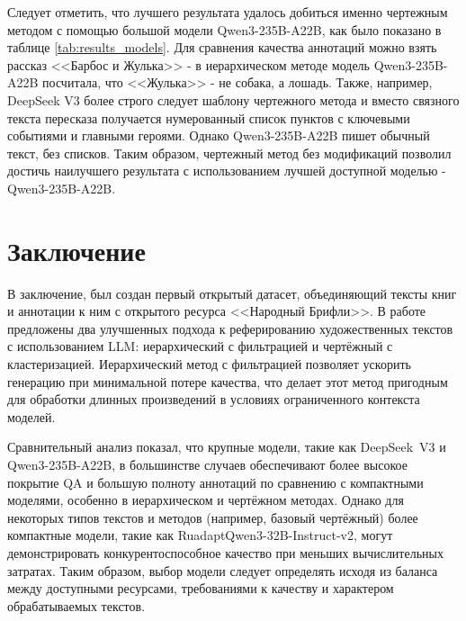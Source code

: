 \documentclass{article}
\begin{document}
Следует отметить, что лучшего результата удалось добиться именно чертежным методом с помощью большой модели Qwen3-\allowbreak 235B-\allowbreak A22B, 
как было показано в таблице \ref{tab:results_models}. Для сравнения качества аннотаций можно взять рассказ <<Барбос и Жулька>> - в иерархическом методе
модель Qwen3-\allowbreak 235B-\allowbreak A22B посчитала, что <<Жулька>> - не собака, а лошадь. Также, например, DeepSeek V3 более строго следует шаблону чертежного метода и вместо связного текста пересказа получается нумерованный список
пунктов с ключевыми событиями и главными героями. Однако Qwen3-\allowbreak 235B-\allowbreak A22B пишет обычный текст, без списков. Таким образом, чертежный метод без модификаций позволил достичь наилучшего результата с использованием лучшей доступной моделью - 
Qwen3-\allowbreak 235B-\allowbreak A22B.


\section*{Заключение}
В заключение, был создан первый открытый датасет, объединяющий тексты книг и аннотации к ним с открытого ресурса <<Народный Брифли>>. 
В работе предложены два улучшенных подхода к реферированию художественных текстов с использованием LLM: иерархический с фильтрацией и чертёжный с кластеризацией. 
Иерархический метод с фильтрацией позволяет ускорить генерацию при минимальной потере качества, 
что делает этот метод пригодным для обработки длинных произведений в условиях ограниченного контекста моделей.  

Сравнительный анализ показал, что крупные модели, такие как DeepSeek~V3 и Qwen3-\allowbreak 235B-\allowbreak A22B, в большинстве случаев обеспечивают более высокое покрытие QA и 
большую полноту аннотаций по сравнению с компактными моделями, особенно в иерархическом и чертёжном методах. 
Однако для некоторых типов текстов и методов (например, базовый чертёжный) более компактные модели, такие как RuadaptQwen3-\allowbreak 32B-\allowbreak Instruct-\allowbreak v2, 
могут демонстрировать конкурентоспособное качество при меньших вычислительных затратах. 
Таким образом, выбор модели следует определять исходя из баланса между доступными ресурсами, требованиями к качеству и характером обрабатываемых текстов.



\end{document}
